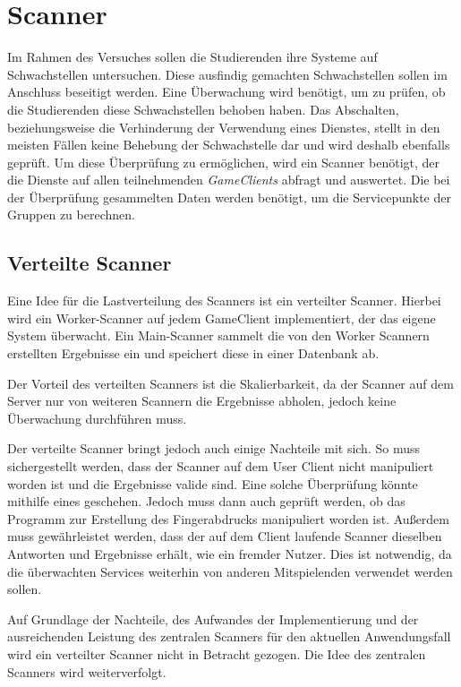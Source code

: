 \section{Scanner} \label{sec:Scanner}
Im Rahmen des Versuches sollen die Studierenden ihre Systeme auf Schwachstellen untersuchen. Diese ausfindig gemachten Schwachstellen sollen im Anschluss beseitigt werden. Eine Überwachung wird benötigt, um zu prüfen, ob die Studierenden diese Schwachstellen behoben haben. Das Abschalten, beziehungsweise die Verhinderung der Verwendung eines Dienstes, stellt in den meisten Fällen keine Behebung der Schwachstelle dar und wird deshalb ebenfalls geprüft. Um diese Überprüfung zu ermöglichen, wird ein Scanner benötigt, der die Dienste auf allen teilnehmenden \textit{GameClients} abfragt und auswertet. Die bei der Überprüfung gesammelten Daten werden benötigt, um die Servicepunkte der Gruppen zu berechnen.

\subsection{Verteilte Scanner}
Eine Idee für die Lastverteilung des Scanners ist ein verteilter Scanner. Hierbei wird ein Worker-Scanner auf jedem GameClient implementiert, der das eigene System überwacht. Ein Main-Scanner sammelt die von den Worker Scannern erstellten Ergebnisse ein und speichert diese in einer Datenbank ab. 

Der Vorteil des verteilten Scanners ist die Skalierbarkeit, da der Scanner auf dem Server nur von weiteren Scannern die Ergebnisse abholen, jedoch keine Überwachung durchführen muss.

Der verteilte Scanner bringt jedoch auch einige Nachteile mit sich. So muss sichergestellt werden, dass der Scanner auf dem User Client nicht manipuliert worden ist und die Ergebnisse valide sind. Eine solche Überprüfung könnte mithilfe eines  geschehen. Jedoch muss dann auch geprüft werden, ob das Programm zur Erstellung des Fingerabdrucks manipuliert worden ist. Außerdem muss gewährleistet werden, dass der auf dem Client laufende Scanner dieselben Antworten und Ergebnisse erhält, wie ein fremder Nutzer. Dies ist notwendig, da die überwachten Services weiterhin von anderen Mitspielenden verwendet werden sollen.

Auf Grundlage der Nachteile, des Aufwandes der Implementierung und der ausreichenden Leistung des zentralen Scanners für den aktuellen Anwendungsfall wird ein verteilter Scanner nicht in Betracht gezogen. Die Idee des zentralen Scanners wird weiterverfolgt.

